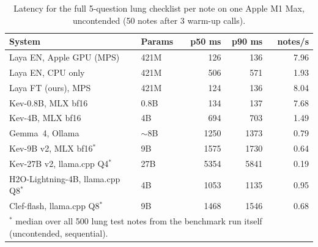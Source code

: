 \begin{table}[t]\centering\small
\caption{Latency for the full 5-question lung checklist per note on one Apple M1 Max, uncontended (50 notes after 3 warm-up calls).}\label{tab:lat}
\begin{tabular}{llrrr}\toprule System & Params & p50 ms & p90 ms & notes/s \\ \midrule
Laya EN, Apple GPU (MPS) & 421M & 126 & 136 & 7.96 \\
Laya EN, CPU only & 421M & 506 & 571 & 1.93 \\
Laya FT (ours), MPS & 421M & 124 & 136 & 8.04 \\
Kev-0.8B, MLX bf16 & 0.8B & 134 & 137 & 7.68 \\
Kev-4B, MLX bf16 & 4B & 694 & 703 & 1.49 \\
Gemma~4, Ollama & $\sim$8B & 1250 & 1373 & 0.79 \\
Kev-9B v2, MLX bf16$^*$ & 9B & 1575 & 1730 & 0.64 \\
Kev-27B v2, llama.cpp Q4$^*$ & 27B & 5354 & 5841 & 0.19 \\
H2O-Lightning-4B, llama.cpp Q8$^*$ & 4B & 1053 & 1135 & 0.95 \\
Clef-flash, llama.cpp Q8$^*$ & 9B & 1468 & 1546 & 0.68 \\
\midrule\multicolumn{5}{l}{\footnotesize $^*$ median over all 500 lung test notes from the benchmark run itself (uncontended, sequential).}\\
\bottomrule\end{tabular}\end{table}